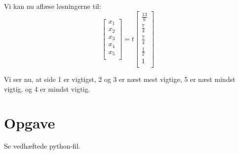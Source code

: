 \documentclass[a4paper,12pt]{article}
\begin{document}
Vi kan nu aflæse løsningerne til:
\[
\left[\begin{array}{c}
    x_1\\
    x_2\\
    x_3\\
    x_4\\
    x_5\\
\end{array}\right]
=
t
\left[\begin{array}{c}
    \frac{13}{6}\\
    \frac{7}{4}\\
    \frac{7}{4}\\
    \frac{1}{2}\\
    1\\
\end{array}\right]
\]

Vi ser nu, at side 1 er vigtigst, 2 og 3 er næst mest vigtige, 5 er næst mindst vigtig, og 4 er mindst vigtig.

\section[Opgave]{Opgave}
Se vedhæftede python-fil.
\end{document}
